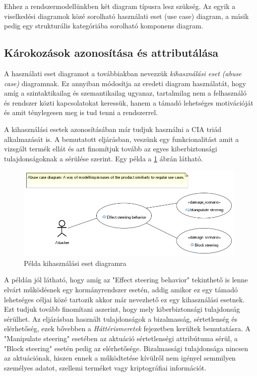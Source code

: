 Ehhez a rendszermodellünkben két diagram típusra lesz szükség. Az egyik a viselkedési diagramok közé sorolható használati eset (use case) diagram, a másik pedig egy strukturális kategóriába sorolható komponens diagram.\\

\subsection{Károkozások azonosítása és attributálása}

A használati eset diagramot a továbbiakban nevezzük \textit{kihasználási eset (abuse case)} diagramnak. Ez annyiban módosítja az eredeti diagram használatát, hogy amíg a szintaktikailag és szemantikailag ugyanaz, tartalmilag nem a felhasználó és rendszer közti kapcsolatokat keressük, hanem a támadó lehetséges motivációját és amit ténylegesen meg is tud tenni a rendszerrel. 

A kihasználási esetek azonosításában már tudjuk használni a CIA triád alkalmazását is. A bemutatott eljárásban, veszünk egy funkcionalitást amit a vizsgált termék ellát és azt finomítjuk tovább az egyes kiberbiztonsági tulajdonságoknak a sérülése szerint. Egy példa a \ref{fig:04_abuse_case} ábrán látható.

\begin{figure}[!ht]
	\centering
	\includegraphics[width=130mm, keepaspectratio]{figures/04_abuse_case.png}
	\caption{Példa kihasználási eset diagramra}
	\label{fig:04_abuse_case}
\end{figure}

A példán jól látható, hogy amíg az "Effect steering behavior" tekinthető is lenne elvárt működésnek egy kormányrendszer esetén, addig amikor ez egy támadó lehetséges céljai közé tartozik akkor már nevezhető ez egy kihasználási esetnek. Ezt tudjuk tovább finomítani aszerint, hogy mely kiberbiztonsági tulajdonság sérülhet. Az eljárásban használt tulajdonságok a bizalmasság, sértetlenség és elérhetőség, ezek bővebben a \textit{Háttérismeretek} fejezetben kerültek bemutatásra. A "Manipulate steering" esetében az aktuáció sértetlenségi attribútuma sérül, a "Block steering" esetén pedig az elérhetősége. Bizalmassági tulajdonsága nincsen az aktuációnak, hiszen ennek a működtetése kívülről nem igényel semmilyen személyes adatot, szellemi terméket vagy kriptográfiai információt.


